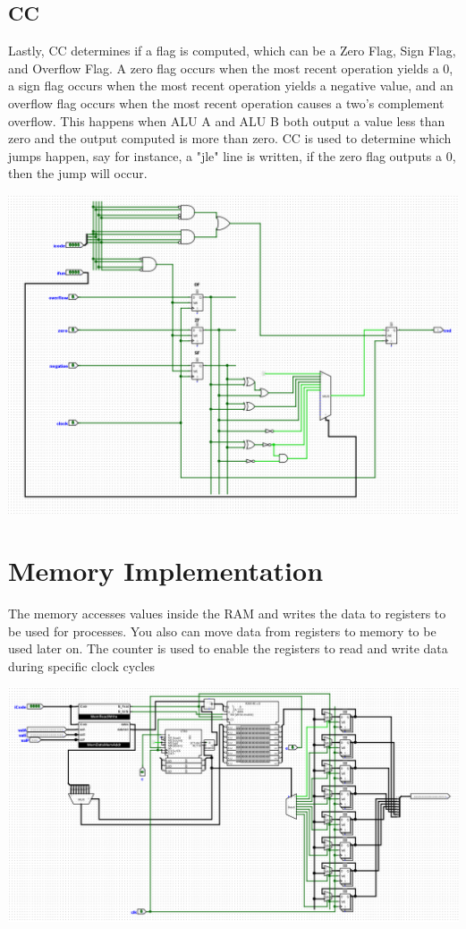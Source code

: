 \documentclass{article}
\begin{document}
\subsection{CC}
Lastly, CC determines if a flag is computed, which can be a Zero Flag, Sign Flag, and Overflow Flag. A zero flag occurs when the most recent operation yields a 0, a sign flag occurs when the most recent operation yields a negative value, and an overflow flag occurs when the most recent operation causes a two's complement overflow. This happens when ALU A and ALU B both output a value less than zero and the output computed is more than zero. CC is used to determine which jumps happen, say for instance, a "jle" line is written, if the zero flag outputs a 0, then the jump will occur. 
\begin{center}
    \includegraphics[scale=.5]{alu_cc.png} \\
\end{center}
\pagebreak

\section{Memory Implementation}
The memory accesses values inside the RAM and writes the data to registers to be used for processes. You also can move data from registers to memory to be used later on. The counter is used to enable the registers to read and write data during specific clock cycles 
\begin{center}
    \includegraphics[scale=.5]{mem.png} \\
\end{center}
\end{document}
